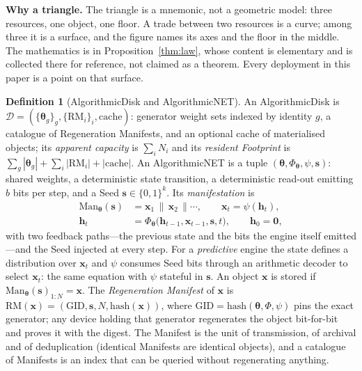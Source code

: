 \documentclass[11pt,a4paper]{article}
\theoremstyle{definition}
\newtheorem{definition}{Definition}[section]
\theoremstyle{plain}
\theoremstyle{remark}
\newcommand{\anet}{AlgorithmicNET}
\newcommand{\adisk}{AlgorithmicDisk}
\newcommand{\seed}{\mathbf{s}}
\newcommand{\weights}{\bm{\theta}}
\newcommand{\file}{\mathbf{x}}
\begin{document}
\begin{keyinsight}
\textbf{Why a triangle.} The triangle is a mnemonic, not a geometric model: three resources,
one object, one floor. A trade between two resources is a curve; among three it is a surface,
and the figure names its axes and the floor in the middle. The mathematics is in
Proposition~\ref{thm:law}, whose content is elementary and is collected there for reference,
not claimed as a theorem. Every deployment in this paper is a point on that surface.
\end{keyinsight}

\begin{definition}[AlgorithmicDisk and AlgorithmicNET]\sloppy
An \adisk{} is $\mathcal{D}=(\{\weights_g\}_{g},\{\mathrm{RM}_i\}_{i},\mathrm{cache})$: generator
weight sets indexed by identity $g$, a catalogue of Regeneration Manifests, and an optional cache
of materialised objects; its \emph{apparent capacity} is $\sum_i N_i$ and its \emph{resident
Footprint} is $\sum_g|\weights_g| + \sum_i|\mathrm{RM}_i| + |\mathrm{cache}|$. An \anet{} is a tuple
$(\weights,\Phi_{\weights},\psi,\seed)$: shared weights, a deterministic state transition, a
deterministic read-out emitting $b$ bits per step, and a Seed $\seed\in\{0,1\}^{k}$. Its
\emph{manifestation} is
\begin{equation}
\begin{aligned}
  \mathrm{Man}_{\weights}(\seed)&=\mathbf{x}_1\,\|\,\mathbf{x}_2\,\|\cdots,\qquad \mathbf{x}_t=\psi(\mathbf{h}_t),\\
  \mathbf{h}_{t}&=\Phi_{\weights}\big(\mathbf{h}_{t-1},\mathbf{x}_{t-1},\seed,t\big),\qquad \mathbf{h}_0=\mathbf{0},
\end{aligned}
\label{eq:manifest}
\end{equation}
with two feedback paths---the previous state and the bits the engine itself emitted---and the
Seed injected at every step. For a \emph{predictive} engine the state defines a distribution
over $\mathbf{x}_t$ and $\psi$ consumes Seed bits through an arithmetic decoder to select
$\mathbf{x}_t$: the same equation with $\psi$ stateful in $\seed$. An object $\file$ is stored if
$\mathrm{Man}_{\weights}(\seed)_{1:N}=\file$. The \emph{Regeneration Manifest} of $\file$ is
$\mathrm{RM}(\file)=(\mathrm{GID},\seed,N,\mathrm{hash}(\file))$, where
$\mathrm{GID}=\mathrm{hash}(\weights,\Phi,\psi)$ pins the exact generator; any device holding that
generator regenerates the object bit-for-bit and proves it with the digest. The Manifest is the
unit of transmission, of archival and of deduplication (identical Manifests are identical objects),
and a catalogue of Manifests is an index that can be queried without regenerating anything.
\end{definition}
\end{document}
